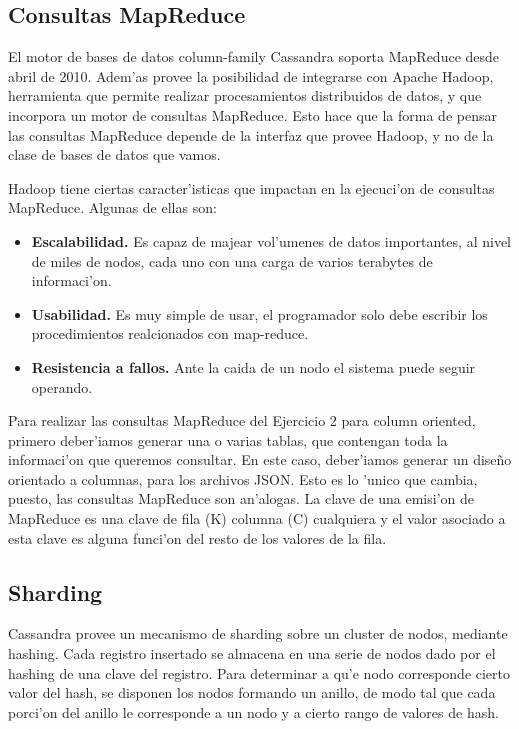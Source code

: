 \subsection{Consultas MapReduce}

El motor de bases de datos column-family Cassandra soporta MapReduce desde abril de 2010. Adem'as provee la posibilidad de integrarse con Apache Hadoop, herramienta que permite realizar procesamientos distribuidos de datos, y que incorpora un motor de consultas MapReduce. Esto hace que la forma de pensar las consultas MapReduce depende de la interfaz que provee Hadoop, y no de la clase de bases de datos que vamos.

Hadoop tiene ciertas caracter'isticas que impactan en la ejecuci'on de consultas MapReduce. Algunas de ellas son:

\begin{itemize}

\item \textbf{Escalabilidad.} Es capaz de majear vol'umenes de datos importantes, al nivel de miles de nodos, cada uno con una carga de varios terabytes de informaci'on.

\item \textbf{Usabilidad.} Es muy simple de usar, el programador solo debe escribir los procedimientos realcionados con map-reduce.

\item \textbf{Resistencia a fallos.} Ante la caida de un nodo el sistema puede seguir operando.
\end{itemize}

Para realizar las consultas MapReduce del Ejercicio 2 para column oriented, primero deber'iamos generar una o varias tablas, que contengan toda la informaci'on que queremos consultar. En este caso, deber'iamos generar un dise\~no orientado a columnas, para los archivos JSON. Esto es lo 'unico que cambia, puesto, las consultas MapReduce son an'alogas. La clave de una emisi'on de MapReduce es una clave de fila (K) columna (C) cualquiera y el valor asociado a esta clave es alguna funci'on del resto de los valores de la fila.

\subsection{Sharding}

Cassandra provee un mecanismo de sharding sobre un cluster de nodos, mediante hashing. Cada registro insertado se almacena en una serie de nodos dado por el hashing de una clave del registro. Para determinar a qu'e nodo corresponde cierto valor del hash, se disponen los nodos formando un anillo, de modo tal que cada porci'on del anillo le corresponde a un nodo y a cierto rango de valores de hash.

